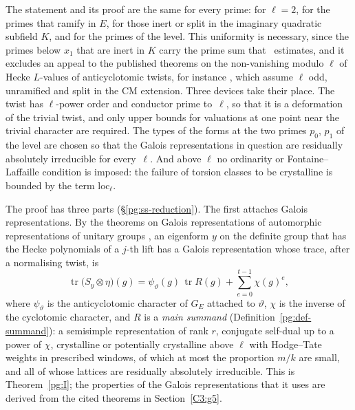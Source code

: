 \documentclass[10pt]{amsart}
\theoremstyle{definition}
\theoremstyle{remark}
\begin{document}
The statement and its proof are the same for every prime: for $\ell=2$, for the primes that
ramify in $E$, for those inert or split in the imaginary quadratic subfield $K$, and for the
primes of the level. This uniformity is necessary, since the primes below $x_1$ that are inert
in $K$ carry the prime sum that~\cite{P46} estimates, and it excludes an appeal to the published theorems on
the non-vanishing modulo $\ell$ of Hecke $L$-values of anticyclotomic twists, for instance
\cite{Finis,HidaNonvanishing,Prasanna}, which assume $\ell$ odd, unramified and split in the CM
extension. Three devices take their place. The twist has $\ell$-power order and conductor prime to~$\ell$, so that it
is a deformation of the trivial twist, and only upper bounds for valuations at one point near
the trivial character are required. The types of the forms at the two primes $p_0$, $p_1$ of the
level are chosen so that the Galois representations in question are
residually absolutely irreducible for every~$\ell$. And above $\ell$ no ordinarity or
Fontaine--Laffaille condition is imposed: the failure of torsion classes to be crystalline is
bounded by the term $\mathrm{loc}_\ell$.

The proof has three parts (\S\ref{pg:ss-reduction}). The first attaches Galois representations.
By the theorems on Galois representations of automorphic representations of unitary groups
\cite{Labesse,BLGGT,HarrisTaylor,Shin,ChenevierHarris,CaraianiDuke,CaraianiANT,BLGGTlp1,BLGGTlp2},
an eigenform $y$ on the definite group that has the Hecke polynomials of a $j$-th lift has a
Galois representation whose trace, after a normalising twist, is
\[
\operatorname{tr}\bigl(S_y\otimes\eta\bigr)(g)=\psi_\vartheta(g)\,\operatorname{tr}R(g)
+\sum_{e=0}^{t-1}\chi(g)^e ,
\]
where $\psi_\vartheta$ is the anticyclotomic character of $G_E$ attached to $\vartheta$, $\chi$
is the inverse of the cyclotomic character, and $R$ is a \emph{main summand}
(Definition~\ref{pg:def-summand}): a semisimple representation of rank $r$, conjugate self-dual up to a power of $\chi$,
crystalline or potentially crystalline above $\ell$ with Hodge--Tate weights in prescribed
windows, of which at most the proportion $m/k$ are small, and all of whose lattices are
residually absolutely irreducible. This is Theorem~\ref{pg:I}; the properties of the Galois
representations that it uses are derived from the cited theorems in Section~\ref{C3:g5}.
\end{document}
